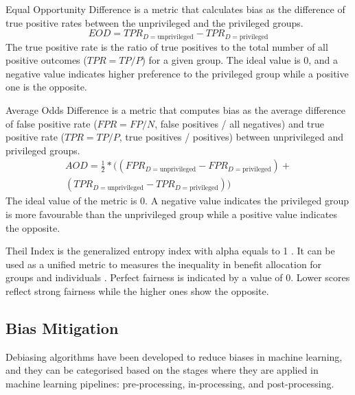 \documentclass[sigconf,review]{acmart}
\begin{document}
Equal Opportunity Difference \cite{bellamy2018ai} is a metric that calculates bias as the difference of true positive rates between the unprivileged and the privileged groups. 
\begin{equation}
	EOD = TPR_{D = \text{unprivileged}} - TPR_{D = \text{privileged}}	
\end{equation}
The true positive rate is the ratio of true positives to the total number of all positive outcomes ($TPR=TP/P$) for a given group. The ideal value is 0, and a negative value indicates higher preference to the privileged group while a positive one is the opposite.

Average Odds Difference \cite{bellamy2018ai} is a metric that computes bias as the average difference of false positive rate ($FPR = FP/N$, false positives / all negatives) and true positive rate ($TPR = TP/P$, true positives / positives) between unprivileged and privileged groups.
\begin{equation}
\begin{aligned}
	AOD = \tfrac{1}{2}* ((FPR_{D = \text{unprivileged}} - FPR_{D = \text{privileged}}) +\\
	(TPR_{D = \text{unprivileged}} - TPR_{D = \text{privileged}}))
\end{aligned}
\end{equation}
The ideal value of the metric is 0. A negative value indicates the privileged group is more favourable than the unprivileged group while a positive value indicates the opposite. 

Theil Index is the generalized entropy index  with alpha equals to 1 \cite{conceicao2000theyoung,bellamy2018ai}. It can be used as a unified metric to measures the inequality in benefit allocation for groups and individuals \cite{speicher2018unified}. Perfect fairness is indicated by a value of 0. Lower scores reflect strong fairness while the higher ones show the opposite.


\subsection{Bias Mitigation}
\label{sec:bias_mitigation}

Debiasing algorithms have been developed to reduce biases in machine learning, and they can be categorised based on the stages where they are applied in machine learning pipelines: pre-processing, in-processing, and post-processing. 
\end{document}
